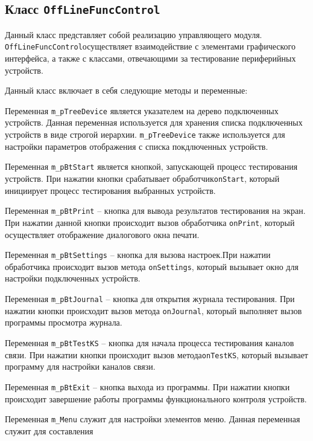 \subsection{Класс \texttt{OffLineFuncControl}}
Данный класс представляет собой реализацию управляющего модуля. \texttt{OffLineFuncControl}осуществляет взаимодействие с элементами графического
интерфейса, а также с классами, отвечающими за тестирование периферийных устройств.

Данный класс включает в себя следующие методы и переменные:
\begin{enum}
	\item Переменная \texttt{m\_pTreeDevice} является указателем на дерево подключенных устройств. Данная переменная
		используется для хранения списка подключенных устройств в виде строгой иерархии.
		\texttt{m\_pTreeDevice} также используется для настройки параметров отображения с списка покдлюченных
		устройств.
	\item Переменная \texttt{m\_pBtStart} является кнопкой, запускающей процесс тестирования устройств. При нажатии
		кнопки срабатывает обработчик\break \texttt{onStart}, который инициирует процесс тестирования выбранных
		устройств.
	\item Переменная \texttt{m\_pBtPrint} -- кнопка для вывода результатов тестирования на экран. При нажатии данной
		кнопки происходит вызов обработчика \texttt{onPrint}, который осуществляет отображение диалогового окна
		печати.
	\item Переменная \texttt{m\_pBtSettings} -- кнопка для вызова настроек.\break При нажатии обработчика происходит вызов
		метода \texttt{onSettings}, который вызывает окно для настройки подключенных устройств.
	\item Переменная \texttt{m\_pBtJournal} -- кнопка для открытия журнала тестирования. При нажатии кнопки
		происходит вызов метода \texttt{onJournal}, который выполняет вызов программы просмотра журнала.
	\item Переменная \texttt{m\_pBtTestKS} -- кнопка для начала процесса тестирования каналов связи. При нажатии
		кнопки происходит вызов метода\break \texttt{onTestKS}, который вызывает программу для настройки каналов
		связи.
	\item Переменная \texttt{m\_pBtExit} -- кнопка выхода из программы. При нажатии кнопки происходит завершение
		работы программы функционального контроля устройств.
	\item Переменная \texttt{m\_Menu} служит для настройки элементов меню. Данная переменная служит для составления

\end{enum}
